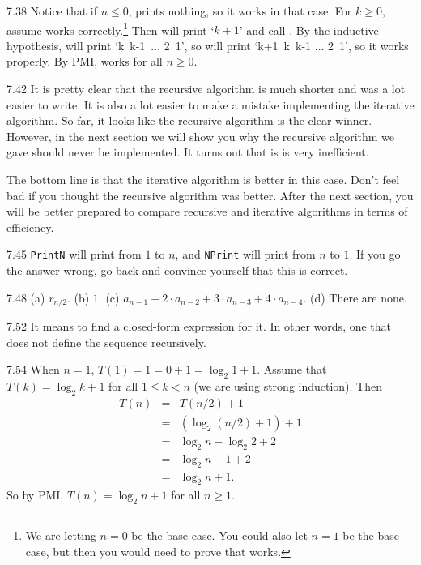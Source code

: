 \begin{Answer}{7.38}
Notice that if $n\leq 0$,  prints nothing, so it works in that case.
For $k\geq 0$, assume  works correctly.\footnote{We are letting $n=0$ be the base case.
You could also let $n=1$ be the base case, but then you would need to prove that  works.}
Then  will print `$k+1$'
and call .  By the inductive hypothesis,
 will print `k\, k-1\, $\ldots$ 2\, 1', so  will print `k+1\, k\, k-1 $\ldots$ 2\, 1',
so it works properly.  By PMI,   works for all $n\geq 0$.
\end{Answer}
\begin{Answer}{7.42}
It is pretty clear that the recursive algorithm
is much shorter and was a lot easier to write.
It is also a lot easier to
make a mistake implementing the iterative algorithm.
So far, it looks like the recursive algorithm is the clear winner.
However, in the next section we will show you why the recursive
algorithm we gave should never be implemented.  It turns out that is is
very inefficient.

The bottom line is that the iterative algorithm is better in this case.
Don't feel bad if you thought the recursive algorithm was better.
After the next section, you will be better prepared to compare
recursive and iterative algorithms in terms of efficiency.
\end{Answer}
\begin{Answer}{7.45}
\verb+PrintN+ will print from $1$ to $n$, and \verb+NPrint+ will print from $n$ to $1$.
If you go the answer wrong, go back and convince yourself that this is correct.
\end{Answer}
\begin{Answer}{7.48}
(a) $r_{n/2}$.
(b) $1$.
(c) $a_{n-1}+2\cdot a_{n-2}+3\cdot a_{n-3}+4\cdot a_{n-4}$.
(d) There are none.
\end{Answer}
\begin{Answer}{7.52}
It means to find a closed-form expression for it.  In other words, one that does not
define the sequence recursively.
\end{Answer}
\begin{Answer}{7.54}
When $n=1$, $T(1)=1=0+1=\log_2 1 + 1$.
Assume that $T(k)=\log_2 k + 1$ for all $1\leq k <n$
(we are using strong induction).
Then
\begin{eqnarray*}
T(n)&=&T(n/2)+1\\
&=&(\log_2 (n/2) + 1) + 1\\
&=&\log_2 n - \log_2 2 + 2\\
&=&\log_2 n - 1 + 2\\
&=&\log_2 n +1.
\end{eqnarray*}
So by PMI, $T(n)=\log_2 n + 1$ for all $n\geq 1$.
\end{Answer}

